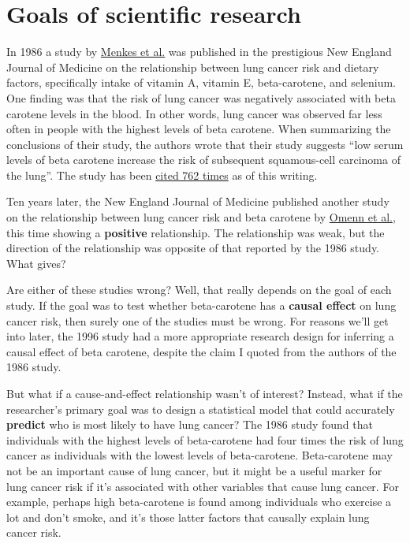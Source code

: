 \documentclass[
]{book}
\begin{document}
\section{Goals of scientific research}\label{goals-of-scientific-research}

In 1986 a study by \href{https://www.nejm.org/doi/full/10.1056/NEJM198611133152003}{Menkes et al.} was published in the prestigious New England Journal of Medicine on the relationship between lung cancer risk and dietary factors, specifically intake of vitamin A, vitamin E, beta-carotene, and selenium. One finding was that the risk of lung cancer was negatively associated with beta carotene levels in the blood. In other words, lung cancer was observed far less often in people with the highest levels of beta carotene. When summarizing the conclusions of their study, the authors wrote that their study suggests ``low serum levels of beta carotene increase the risk of subsequent squamous-cell carcinoma of the lung''. The study has been \href{https://scholar.google.com/scholar?hl=en&as_sdt=0\%2C33&q=Serum+beta-carotene\%2C+vitamins+A+and+E\%2C+selenium\%2C+and+the+risk+of+lung+cancer+&btnG=}{cited 762 times} as of this writing.

Ten years later, the New England Journal of Medicine published another study on the relationship between lung cancer risk and beta carotene by \href{https://www.nejm.org/doi/full/10.1056/NEJM199605023341802}{Omenn et al.}, this time showing a \textbf{positive} relationship. The relationship was weak, but the direction of the relationship was opposite of that reported by the 1986 study. What gives?

Are either of these studies wrong? Well, that really depends on the goal of each study. If the goal was to test whether beta-carotene has a \textbf{causal effect} on lung cancer risk, then surely one of the studies must be wrong. For reasons we'll get into later, the 1996 study had a more appropriate research design for inferring a causal effect of beta carotene, despite the claim I quoted from the authors of the 1986 study.

But what if a cause-and-effect relationship wasn't of interest? Instead, what if the researcher's primary goal was to design a statistical model that could accurately \textbf{predict} who is most likely to have lung cancer? The 1986 study found that individuals with the highest levels of beta-carotene had four times the risk of lung cancer as individuals with the lowest levels of beta-carotene. Beta-carotene may not be an important cause of lung cancer, but it might be a useful marker for lung cancer risk if it's associated with other variables that cause lung cancer. For example, perhaps high beta-carotene is found among individuals who exercise a lot and don't smoke, and it's those latter factors that causally explain lung cancer risk.
\end{document}
